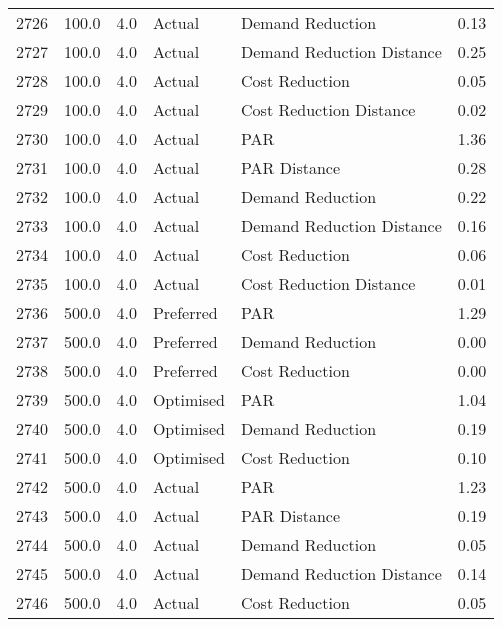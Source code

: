 \begin{longtable}{lrrllr}
2726 &        100.0 &     4.0 &         Actual &           Demand Reduction &   0.13 \\
2727 &        100.0 &     4.0 &         Actual &  Demand Reduction Distance &   0.25 \\
2728 &        100.0 &     4.0 &         Actual &             Cost Reduction &   0.05 \\
2729 &        100.0 &     4.0 &         Actual &    Cost Reduction Distance &   0.02 \\
2730 &        100.0 &     4.0 &         Actual &                        PAR &   1.36 \\
2731 &        100.0 &     4.0 &         Actual &               PAR Distance &   0.28 \\
2732 &        100.0 &     4.0 &         Actual &           Demand Reduction &   0.22 \\
2733 &        100.0 &     4.0 &         Actual &  Demand Reduction Distance &   0.16 \\
2734 &        100.0 &     4.0 &         Actual &             Cost Reduction &   0.06 \\
2735 &        100.0 &     4.0 &         Actual &    Cost Reduction Distance &   0.01 \\
2736 &        500.0 &     4.0 &      Preferred &                        PAR &   1.29 \\
2737 &        500.0 &     4.0 &      Preferred &           Demand Reduction &   0.00 \\
2738 &        500.0 &     4.0 &      Preferred &             Cost Reduction &   0.00 \\
2739 &        500.0 &     4.0 &      Optimised &                        PAR &   1.04 \\
2740 &        500.0 &     4.0 &      Optimised &           Demand Reduction &   0.19 \\
2741 &        500.0 &     4.0 &      Optimised &             Cost Reduction &   0.10 \\
2742 &        500.0 &     4.0 &         Actual &                        PAR &   1.23 \\
2743 &        500.0 &     4.0 &         Actual &               PAR Distance &   0.19 \\
2744 &        500.0 &     4.0 &         Actual &           Demand Reduction &   0.05 \\
2745 &        500.0 &     4.0 &         Actual &  Demand Reduction Distance &   0.14 \\
2746 &        500.0 &     4.0 &         Actual &             Cost Reduction &   0.05 \\

\end{longtable}
